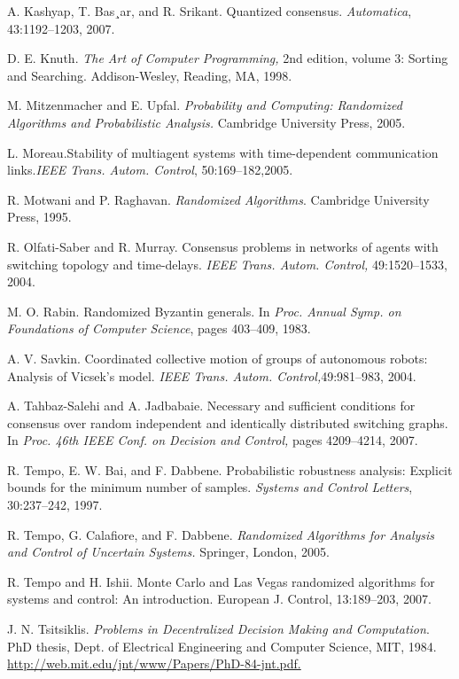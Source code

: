 \documentclass[12pt]{article} %
\begin{document}
\begin{thebibliography}{30}
		
		 A. Kashyap, T. Bas¸ar, and R. Srikant. Quantized consensus. \textit{Automatica}, 43:1192–1203, 2007.
		
		
		 D. E. Knuth. \textit{The Art of Computer Programming,} 2nd edition, volume 3: Sorting and Searching. Addison-Wesley, Reading, MA, 1998.
		
		
		 M. Mitzenmacher and E. Upfal. \textit{Probability and Computing: Randomized Algorithms and Probabilistic Analysis.} Cambridge University Press, 2005.
		
		
		 L. Moreau.Stability of multiagent systems with time-dependent communication links.\textit{IEEE Trans. Autom. Control}, 50:169–182,2005.
		
		
		 R. Motwani and P. Raghavan. \textit{Randomized Algorithms}. Cambridge University Press, 1995.
		
		
		 R. Olfati-Saber and R. Murray. Consensus problems in networks of agents with switching topology and time-delays. \textit{IEEE Trans. Autom. Control,} 49:1520–1533, 2004.
		
		
		 M. O. Rabin. Randomized Byzantin generals. In \textit{Proc. Annual Symp. on Foundations of Computer Science}, pages 403–409, 1983.
		
		
		 A. V. Savkin. Coordinated collective motion of groups of autonomous robots: Analysis of Vicsek’s model. \textit{IEEE Trans. Autom. Control,}49:981–983, 2004.
		
		
		 A. Tahbaz-Salehi and A. Jadbabaie. Necessary and sufficient conditions for consensus over random independent and identically distributed switching graphs. In \textit{Proc. 46th IEEE Conf. on Decision and Control,} pages 4209–4214, 2007.
		
		
		 R. Tempo, E. W. Bai, and F. Dabbene. Probabilistic robustness analysis: Explicit bounds for the minimum number of samples. \textit{Systems and Control Letters}, 30:237–242, 1997.
		
		
		  R. Tempo, G. Calafiore, and F. Dabbene. \textit{Randomized Algorithms for Analysis and Control of Uncertain Systems.} Springer, London, 2005.
		
		
		 R. Tempo and H. Ishii. Monte Carlo and Las Vegas randomized algorithms for systems and control: An introduction. European J. Control, 13:189–203, 2007.
		
		
		 J. N. Tsitsiklis. \textit{Problems in Decentralized Decision Making and Computation}. PhD thesis, Dept. of Electrical Engineering and Computer Science, MIT, 1984. \href{http://web.mit.edu/jnt/www/Papers/PhD-84-jnt.pdf.}{http://web.mit.edu/jnt/www/Papers/PhD-84-jnt.pdf.}
		

\end{thebibliography}
\end{document}
